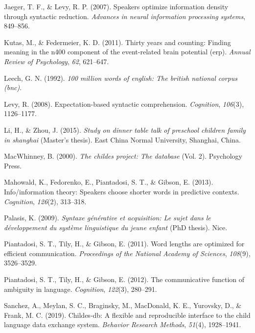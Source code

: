 \documentclass[11pt,]{article}
\begin{document}
\leavevmode\hypertarget{ref-jaeger2007speakers}{}%
Jaeger, T. F., \& Levy, R. P. (2007). Speakers optimize information density through syntactic reduction. \emph{Advances in neural information processing systems}, 849--856.

\leavevmode\hypertarget{ref-kutas2011thirty}{}%
Kutas, M., \& Federmeier, K. D. (2011). Thirty years and counting: Finding meaning in the n400 component of the event-related brain potential (erp). \emph{Annual Review of Psychology}, \emph{62}, 621--647.

\leavevmode\hypertarget{ref-leech1992100}{}%
Leech, G. N. (1992). \emph{100 million words of english: The british national corpus (bnc)}.

\leavevmode\hypertarget{ref-levy2008expectation}{}%
Levy, R. (2008). Expectation-based syntactic comprehension. \emph{Cognition}, \emph{106}(3), 1126--1177.

\leavevmode\hypertarget{ref-li2015dinner}{}%
Li, H., \& Zhou, J. (2015). \emph{Study on dinner table talk of preschool children family in shanghai} (Master's thesis). East China Normal University, Shanghai, China.

\leavevmode\hypertarget{ref-macwhinney2000childes}{}%
MacWhinney, B. (2000). \emph{The childes project: The database} (Vol. 2). Psychology Press.

\leavevmode\hypertarget{ref-mahowald2013info}{}%
Mahowald, K., Fedorenko, E., Piantadosi, S. T., \& Gibson, E. (2013). Info/information theory: Speakers choose shorter words in predictive contexts. \emph{Cognition}, \emph{126}(2), 313--318.

\leavevmode\hypertarget{ref-palasis2009syntaxe}{}%
Palasis, K. (2009). \emph{Syntaxe générative et acquisition: Le sujet dans le développement du système linguistique du jeune enfant} (PhD thesis). Nice.

\leavevmode\hypertarget{ref-piantadosi2011word}{}%
Piantadosi, S. T., Tily, H., \& Gibson, E. (2011). Word lengths are optimized for efficient communication. \emph{Proceedings of the National Academy of Sciences}, \emph{108}(9), 3526--3529.

\leavevmode\hypertarget{ref-piantadosi2012communicative}{}%
Piantadosi, S. T., Tily, H., \& Gibson, E. (2012). The communicative function of ambiguity in language. \emph{Cognition}, \emph{122}(3), 280--291.

\leavevmode\hypertarget{ref-sanchez2019childes}{}%
Sanchez, A., Meylan, S. C., Braginsky, M., MacDonald, K. E., Yurovsky, D., \& Frank, M. C. (2019). Childes-db: A flexible and reproducible interface to the child language data exchange system. \emph{Behavior Research Methods}, \emph{51}(4), 1928--1941.
\end{document}

